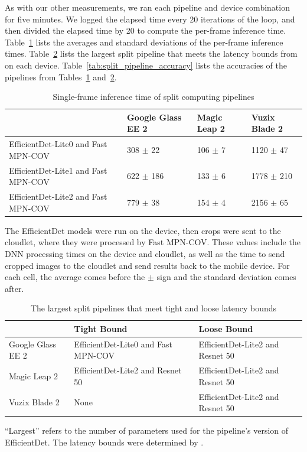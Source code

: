 As with our other measurements, we ran each pipeline and device combination for
five minutes.
We logged the elapsed time every 20 iterations of the loop, and then divided the
elapsed time by 20 to compute the per-frame inference time.
Table~\ref{tab:split_time} lists the averages and standard deviations of the
per-frame inference times.
Table~\ref{tab:split_latency_bound} lists the largest
split pipeline that meets the latency bounds from \citet{chen2017} on each
device.
Table~\ref{tab:split_pipeline_accuracy} lists the accuracies of the pipelines from
Tables~\ref{tab:split_time} and~\ref{tab:split_latency_bound}.

\begin{table}
\begin{tabular}{|l||l|l|l|}
  \hline
  & Google Glass EE 2 & Magic Leap 2 & Vuzix Blade 2\\
  \hline
  \hline
  EfficientDet-Lite0 and Fast MPN-COV & 308 $\pm$ 22 & 106 $\pm$ 7 & 1120 $\pm$ 47\\
  EfficientDet-Lite1 and Fast MPN-COV & 622 $\pm$ 186 & 133 $\pm$ 6 & 1778 $\pm$ 210\\
  EfficientDet-Lite2 and Fast MPN-COV & 779 $\pm$ 38 & 154 $\pm$ 4 & 2156 $\pm$ 65\\
  \hline
\end{tabular}
\begin{captiontext}
  The EfficientDet models were run on the device, then crops were sent to the
  cloudlet, where they were processed by Fast MPN-COV.
  These values include the DNN processing times on the device and cloudlet, as
  well as the time to send cropped images to the cloudlet and send results
  back to the mobile device.
  For each cell, the average comes before the $\pm$ sign and the standard
  deviation comes after.
\end{captiontext}
  \caption{
    Single-frame inference time of split computing pipelines
  }\label{tab:split_time}
\end{table}

\begin{table}
\begin{tabular}{|l||l|l|}
  \hline
  & Tight Bound & Loose Bound\\
  \hline
  \hline
  Google Glass EE 2 & EfficientDet-Lite0 and Fast MPN-COV & EfficientDet-Lite2 and Resnet 50\\
  Magic Leap 2 & EfficientDet-Lite2 and Resnet 50 & EfficientDet-Lite2 and Resnet 50\\
  Vuzix Blade 2 & None & EfficientDet-Lite2 and Resnet 50\\
  \hline
\end{tabular}
\begin{captiontext}
  ``Largest'' refers to the number of parameters used for the pipeline's version
  of EfficientDet.
  The latency bounds were determined by \citet{chen2017}.
  \end{captiontext}
  \caption{
    The largest split pipelines that meet tight and loose latency bounds
  }\label{tab:split_latency_bound}
\end{table}

